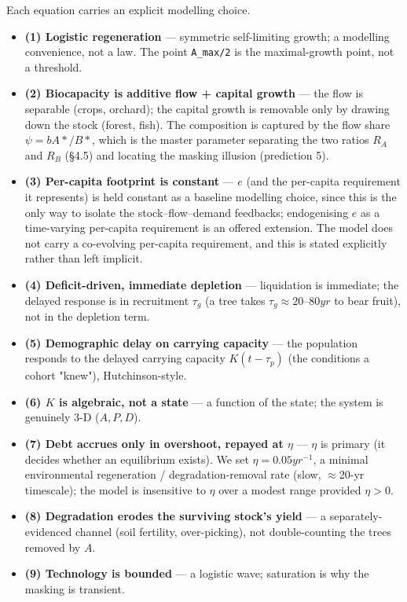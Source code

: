 \documentclass[11pt]{article}
\begin{document}
Each equation carries an explicit modelling choice.

\begin{itemize}
\item \textbf{(1) Logistic regeneration} — symmetric self-limiting growth; a modelling convenience, not a law. The point \texttt{A\_max/2} is the maximal-growth point, not a threshold.
\item \textbf{(2) Biocapacity is additive flow + capital growth} — the flow is separable (crops, orchard); the capital growth is removable only by drawing down the stock (forest, fish). The composition is captured by the flow share $\psi{} = bA*/B*$, which is the master parameter separating the two ratios $R_{A}$ and $R_{B}$ (§4.5) and locating the masking illusion (prediction 5).
\item \textbf{(3) Per-capita footprint is constant} — $e$ (and the per-capita requirement it represents) is held constant as a baseline modelling choice, since this is the only way to isolate the stock–flow–demand feedbacks; endogenising $e$ as a time-varying per-capita requirement is an offered extension. The model does not carry a co-evolving per-capita requirement, and this is stated explicitly rather than left implicit.
\item \textbf{(4) Deficit-driven, immediate depletion} — liquidation is immediate; the delayed response is in recruitment $\tau{}_{g}$ (a tree takes $\tau{}_{g} \approx{} 20–80 yr$ to bear fruit), not in the depletion term.
\item \textbf{(5) Demographic delay on carrying capacity} — the population responds to the delayed carrying capacity $K(t-\tau{}_{p})$ (the conditions a cohort "knew"), Hutchinson-style.
\item \textbf{(6) $K$ is algebraic, not a state} — a function of the state; the system is genuinely 3-D ($A, P, D$).
\item \textbf{(7) Debt accrues only in overshoot, repayed at $\eta{}$} — $\eta{}$ is primary (it decides whether an equilibrium exists). We set $\eta{} = 0.05 yr^{-1}$, a minimal environmental regeneration / degradation-removal rate (slow, \ensuremath{\approx{}}20-yr timescale); the model is insensitive to $\eta{}$ over a modest range provided $\eta{} > 0$.
\item \textbf{(8) Degradation erodes the surviving stock's yield} — a separately-evidenced channel (soil fertility, over-picking), not double-counting the trees removed by $A$.
\item \textbf{(9) Technology is bounded} — a logistic wave; saturation is why the masking is transient.
\end{itemize}
\end{document}
